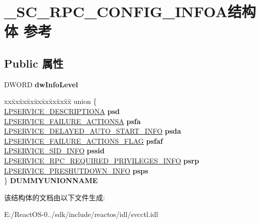 \hypertarget{struct___s_c___r_p_c___c_o_n_f_i_g___i_n_f_o_a}{}\section{\+\_\+\+S\+C\+\_\+\+R\+P\+C\+\_\+\+C\+O\+N\+F\+I\+G\+\_\+\+I\+N\+F\+O\+A结构体 参考}
\label{struct___s_c___r_p_c___c_o_n_f_i_g___i_n_f_o_a}
\subsection*{Public 属性}
\begin{DoxyCompactItemize}
\item 
\mbox{\label{struct___s_c___r_p_c___c_o_n_f_i_g___i_n_f_o_a_a191b19e456adb0cc226079f493ff9cb7}} 
D\+W\+O\+RD {\bfseries dw\+Info\+Level}
\item 
\mbox{\label{struct___s_c___r_p_c___c_o_n_f_i_g___i_n_f_o_a_a93ee3752c78aff9eca92ee8727cb781f}} 
\begin{tabbing}
xx\=xx\=xx\=xx\=xx\=xx\=xx\=xx\=xx\=\kill
union \{\\
\>\hyperlink{struct___s_e_r_v_i_c_e___d_e_s_c_r_i_p_t_i_o_n_a}{LPSERVICE\_DESCRIPTIONA} {\bfseries psd}\\
\>\hyperlink{struct___s_e_r_v_i_c_e___f_a_i_l_u_r_e___a_c_t_i_o_n_s_a}{LPSERVICE\_FAILURE\_ACTIONSA} {\bfseries psfa}\\
\>\hyperlink{struct___s_e_r_v_i_c_e___d_e_l_a_y_e_d___a_u_t_o___s_t_a_r_t___i_n_f_o}{LPSERVICE\_DELAYED\_AUTO\_START\_INFO} {\bfseries psda}\\
\>\hyperlink{struct___s_e_r_v_i_c_e___f_a_i_l_u_r_e___a_c_t_i_o_n_s___f_l_a_g}{LPSERVICE\_FAILURE\_ACTIONS\_FLAG} {\bfseries psfaf}\\
\>\hyperlink{struct___s_e_r_v_i_c_e___s_i_d___i_n_f_o}{LPSERVICE\_SID\_INFO} {\bfseries pssid}\\
\>\hyperlink{struct___s_e_r_v_i_c_e___r_p_c___r_e_q_u_i_r_e_d___p_r_i_v_i_l_e_g_e_s___i_n_f_o}{LPSERVICE\_RPC\_REQUIRED\_PRIVILEGES\_INFO} {\bfseries psrp}\\
\>\hyperlink{struct___s_e_r_v_i_c_e___p_r_e_s_h_u_t_d_o_w_n___i_n_f_o}{LPSERVICE\_PRESHUTDOWN\_INFO} {\bfseries psps}\\
\} {\bfseries DUMMYUNIONNAME}\\

\end{tabbing}\end{DoxyCompactItemize}


该结构体的文档由以下文件生成\+:\begin{DoxyCompactItemize}
\item 
E\+:/\+React\+O\+S-\/0../sdk/include/reactos/idl/svcctl.\+idl\end{DoxyCompactItemize}
